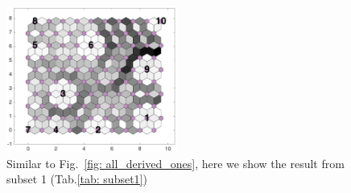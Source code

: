\begin{figure}
        \centering
        \includegraphics[width=0.5\textwidth]{../../images0.01/M31/2D/image_subsets/subset1_dist_with_hits_t.png}
    \caption{Similar to Fig.~\ref{fig: all_derived_ones}, here we show the result from subset 1 (Tab.\ref{tab: subset1})}
    \label{fig: subset1}
\end{figure}